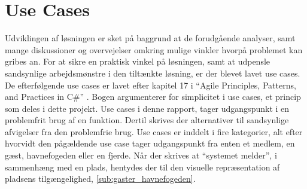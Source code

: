 \section{Use Cases}

Udviklingen af løsningen er sket på baggrund at de forudgående analyser, samt mange diskussioner og overvejelser omkring mulige vinkler hvorpå problemet kan gribes an. For at sikre en praktisk vinkel på løsningen, samt at udpensle sandsynlige arbejdsmønstre i den tiltænkte løsning, er der blevet lavet use cases. De efterfølgende use cases er lavet efter kapitel 17 i “Agile Principles, Patterns, and Practices in C\#” \cite{martin2006agile}. Bogen argumenterer for simplicitet i use cases, et princip som deles i dette projekt. Use cases i denne rapport, tager udgangspunkt i en problemfrit brug af en funktion. Dertil skrives der alternativer til sandsynlige afvigelser fra den problemfrie brug. Use cases er inddelt i fire kategorier, alt efter hvorvidt den pågældende use case tager udgangspunkt fra enten et medlem, en gæst, havnefogeden eller en fjerde. Når der skrives at \enquote{systemet melder}, i sammenhæng med en plads, hentydes der til den visuelle repræsentation af pladsens tilgængelighed, \cref{sub:gaster_havnefogeden}.

